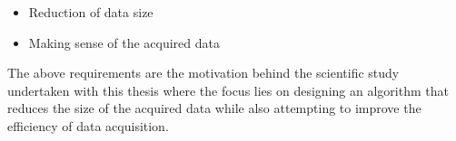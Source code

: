 \begin{itemize}
    \item Reduction of data size
    \item Making sense of the acquired data
\end{itemize} 

The above requirements are the motivation behind the scientific study undertaken with this thesis where the focus lies on designing an algorithm that reduces the size of the acquired data while also attempting to improve the efficiency of data acquisition. 

